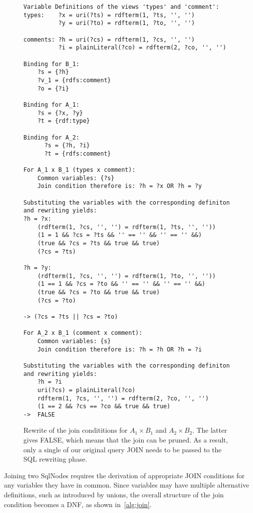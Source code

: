 \documentclass[a4paper,twoside,bibtotoc,abstracton,12pt,BCOR=15mm]{scrreprt}
\begin{document}
\begin{figure}
\begin{scriptsize}
\begin{lstlisting}
Variable Definitions of the views 'types' and 'comment':
types:    ?x = uri(?ts) = rdfterm(1, ?ts, '', '')
          ?y = uri(?to) = rdfterm(1, ?to, '', '')

comments: ?h = uri(?cs) = rdfterm(1, ?cs, '', '')
          ?i = plainLiteral(?co) = rdfterm(2, ?co, '', '')

Binding for B_1:
    ?s = {?h}
    ?v_1 = {rdfs:comment}
    ?o = {?i}

Binding for A_1:
    ?s = {?x, ?y}
    ?t = {rdf:type}

Binding for A_2:
      ?s = {?h, ?i}
      ?t = {rdfs:comment}

For A_1 x B_1 (types x comment):
    Common variables: {?s}
    Join condition therefore is: ?h = ?x OR ?h = ?y    

Substituting the variables with the corresponding definiton
and rewriting yields:
?h = ?x:
    (rdfterm(1, ?cs, '', '') = rdfterm(1, ?ts, '', '')) 
    (1 = 1 && ?cs = ?ts && '' == '' && '' == '' &&) 
    (true && ?cs = ?ts && true && true) 
    (?cs = ?ts)

?h = ?y:
    (rdfterm(1, ?cs, '', '') = rdfterm(1, ?to, '', ''))
    (1 == 1 && ?cs = ?to && '' == '' && '' == '' &&)
    (true && ?cs = ?to && true && true)
    (?cs = ?to)
    
-> (?cs = ?ts || ?cs = ?to)

For A_2 x B_1 (comment x comment):
    Common variables: {s}
    Join condition therefore is: ?h = ?h OR ?h = ?i  

Substituting the variables with the corresponding definiton
and rewriting yields:
    ?h = ?i
    uri(?cs) = plainLiteral(?co)
    rdfterm(1, ?cs, '', '') = rdfterm(2, ?co, '', '')
    (1 == 2 && ?cs == ?co && true && true) 
->  FALSE

\end{lstlisting}
\end{scriptsize}
\caption{Rewrite of the join condititions for $A_1 \times B_1$ and $A_2 \times B_2$. The latter gives FALSE, which means that the join can be
pruned. As a result, only a single of our original query JOIN needs to be passed to the SQL rewriting phase. }
\label{fig:join-rewrite-expr}
\end{figure}


Joining two SqlNodes requires the derivation of appropriate JOIN conditions for any variables they have in common.
Since variables may have multiple alternative definitions, such as introduced by unions, the overall structure of
the join condition becomes a DNF, as shown in~\autoref{alg:join}.
\end{document}
